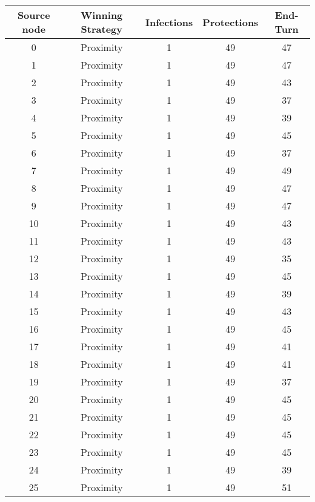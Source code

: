 \documentclass[results.tex]{subfiles}
\begin{document}
\begin{center}
  \begin{tabular}{| c || c | c | c | c |}
    \hline
    {\bfseries Source node} & {\bfseries Winning Strategy} & {\bfseries Infections} & {\bfseries Protections} & {\bfseries End-Turn} \\  %
    \hline\hline
    0 & Proximity & 1 & 49 & 47 \\ 
    \hline
    1 & Proximity & 1 & 49 & 47 \\ 
    \hline
    2 & Proximity & 1 & 49 & 43 \\ 
    \hline
    3 & Proximity & 1 & 49 & 37 \\ 
    \hline
    4 & Proximity & 1 & 49 & 39 \\ 
    \hline
    5 & Proximity & 1 & 49 & 45 \\ 
    \hline
    6 & Proximity & 1 & 49 & 37 \\ 
    \hline
    7 & Proximity & 1 & 49 & 49 \\ 
    \hline
    8 & Proximity & 1 & 49 & 47 \\ 
    \hline
    9 & Proximity & 1 & 49 & 47 \\ 
    \hline
    10 & Proximity & 1 & 49 & 43 \\ 
    \hline
    11 & Proximity & 1 & 49 & 43 \\ 
    \hline
    12 & Proximity & 1 & 49 & 35 \\ 
    \hline
    13 & Proximity & 1 & 49 & 45 \\ 
    \hline
    14 & Proximity & 1 & 49 & 39 \\ 
    \hline
    15 & Proximity & 1 & 49 & 43 \\ 
    \hline
    16 & Proximity & 1 & 49 & 45 \\ 
    \hline
    17 & Proximity & 1 & 49 & 41 \\ 
    \hline
    18 & Proximity & 1 & 49 & 41 \\ 
    \hline
    19 & Proximity & 1 & 49 & 37 \\ 
    \hline
    20 & Proximity & 1 & 49 & 45 \\ 
    \hline
    21 & Proximity & 1 & 49 & 45 \\ 
    \hline
    22 & Proximity & 1 & 49 & 45 \\ 
    \hline
    23 & Proximity & 1 & 49 & 45 \\ 
    \hline
    24 & Proximity & 1 & 49 & 39 \\ 
    \hline
    25 & Proximity & 1 & 49 & 51 \\ 

\end{tabular}
\end{center}
\end{document}
